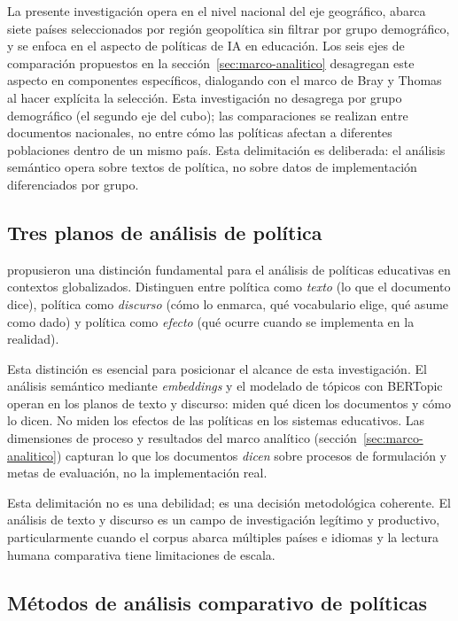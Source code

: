 La presente investigación opera en el nivel nacional del eje geográfico, abarca siete países seleccionados por región geopolítica sin filtrar por grupo demográfico, y se enfoca en el aspecto de políticas de IA en educación. Los seis ejes de comparación propuestos en la sección~\ref{sec:marco-analitico} desagregan este aspecto en componentes específicos, dialogando con el marco de Bray y Thomas al hacer explícita la selección. Esta investigación no desagrega por grupo demográfico (el segundo eje del cubo); las comparaciones se realizan entre documentos nacionales, no entre cómo las políticas afectan a diferentes poblaciones dentro de un mismo país. Esta delimitación es deliberada: el análisis semántico opera sobre textos de política, no sobre datos de implementación diferenciados por grupo.


\subsection{Tres planos de análisis de política}

\citet{rizvi2010globalizing} propusieron una distinción fundamental para el análisis de políticas educativas en contextos globalizados. Distinguen entre política como \textit{texto} (lo que el documento dice), política como \textit{discurso} (cómo lo enmarca, qué vocabulario elige, qué asume como dado) y política como \textit{efecto} (qué ocurre cuando se implementa en la realidad).

Esta distinción es esencial para posicionar el alcance de esta investigación. El análisis semántico mediante \textit{embeddings} y el modelado de tópicos con BERTopic operan en los planos de texto y discurso: miden qué dicen los documentos y cómo lo dicen. No miden los efectos de las políticas en los sistemas educativos. Las dimensiones de proceso y resultados del marco analítico (sección~\ref{sec:marco-analitico}) capturan lo que los documentos \emph{dicen} sobre procesos de formulación y metas de evaluación, no la implementación real.

Esta delimitación no es una debilidad; es una decisión metodológica coherente. El análisis de texto y discurso es un campo de investigación legítimo y productivo, particularmente cuando el corpus abarca múltiples países e idiomas y la lectura humana comparativa tiene limitaciones de escala.


\subsection{Métodos de análisis comparativo de políticas}

